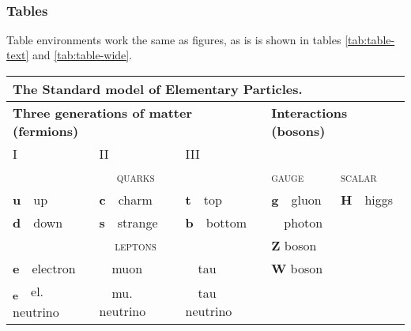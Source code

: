 \documentclass[
	raggedright,
	twoside,
	12pt,
	colorful,
]{tufte-style-article}
\begin{document}
\newpage~


\newpage

\subsubsection{Tables}

Table environments work the same as figures, as is is shown in tables \ref{tab:table-text} and \ref{tab:table-wide}.

\begin{table}[!htb]\small
{}
\begin{tabular}{lllll}
	\multicolumn{5}{l}{\textbf{The Standard model of Elementary Particles.}}\\
	\toprule
	\multicolumn{3}{l}{\textbf{Three generations of matter (fermions)}} & \multicolumn{2}{l}{\textbf{Interactions (bosons)}} \\
	I & II & III & & \\
	\multicolumn{3}{c}{\textsc{quarks}} & \textsc{gauge} & \textsc{scalar} \\
	\cmidrule(lr){1-3}\cmidrule(lr){4-4}\cmidrule(lr){5-5}
	\textbf{u}~~up & \textbf{c}~~charm & \textbf{t}~~top & \textbf{g}~~gluon & \textbf{H}~~higgs \\
	\textbf{d}~~down & \textbf{s}~~strange & \textbf{b}~~bottom & \textbf{\textgamma}~~photon & \\
	\multicolumn{3}{c}{\textsc{leptons}} & \textbf{Z} boson  & \\
	\cmidrule(lr){1-3}
	\textbf{e}~~electron & \textbf{\textmu}~~muon & \textbf{\texttau}~~tau & \textbf{W} boson & \\
	\textbf{\textnu\textsubscript{e}}~~el. neutrino & \textbf{\textnu\textsubscript{\textmu}}~~mu. neutrino & \textbf{\textnu\textsubscript{\texttau}}~~tau neutrino &  & \\
	\bottomrule
\end{tabular}
\end{table}
\end{document}

